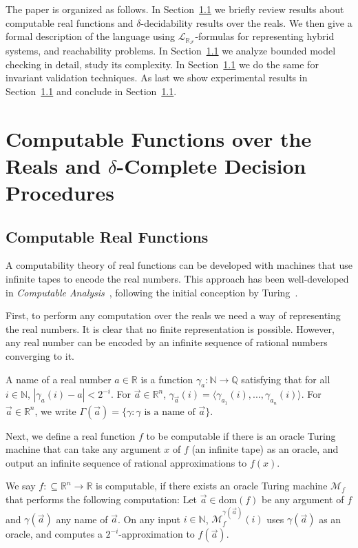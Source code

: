 \documentclass[envcountsect]{llncs}
\newcommand{\dom}{\mathrm{dom}}
\newcommand{\lrf}{\mathcal{L}_{\mathbb{R}_{\mathcal{F}}}}
\begin{document}
The paper is organized as follows. In Section~\ref{} we briefly review results 
about computable real functions and $\delta$-decidability results over the
reals. We then give a formal description of the language using $\lrf$-formulas
for representing hybrid systems, and reachability problems. In Section~\ref{} we
analyze bounded model checking in detail, study its complexity. In
Section~\ref{} we do the same for invariant validation techniques. As last we
show experimental results in Section~\ref{} and conclude in Section~\ref{}.

 

\section{Computable Functions over the Reals and $\delta$-Complete Decision Procedures}

\subsection{Computable Real Functions}

A computability theory of real functions can be developed with machines that 
use infinite tapes to encode the real numbers. This approach has been
well-developed in {\em Computable Analysis}~\cite{CAbook,Kobook,vasco},
following the initial conception by Turing~\cite{}.

First, to perform any computation over the reals we need a way of representing 
the real numbers. It is clear that no finite representation is possible.
However, any real number can be encoded by an infinite sequence of rational
numbers converging to it. 
\begin{definition}[Names]
A name of a real number $a\in \mathbb{R}$ is a function
$\mathcal{\gamma}_a: \mathbb{N}\rightarrow \mathbb{Q}$ satisfying that for all
$i\in \mathbb{N}$, $|\gamma_a(i) - a|<2^{-i}.$ For $\vec a\in \mathbb{R}^n$,
$\gamma_{\vec a}(i) = \langle \gamma_{a_1}(i), ..., \gamma_{a_n}(i)\rangle$. For
$\vec a\in \mathbb{R}^n$, we write $\Gamma(\vec a) = \{\gamma: \gamma\mbox{ is a
name of }\vec a\}$. 
\end{definition}

Next, we define a real function $f$ to be computable if there is an oracle 
Turing machine that can take any argument $x$ of $f$ (an infinite tape) as an
oracle, and output an infinite sequence of rational approximations to $f(x)$. 

\begin{definition} We say
$f:\subseteq\mathbb{R}^n\rightarrow \mathbb{R}$ is computable, if there exists
an oracle Turing machine $\mathcal{M}_f$ that performs the following
computation: Let $\vec a\in \dom(f)$ be any argument of $f$ and $\gamma(\vec a)$
any name of $\vec a$. On any input $i\in \mathbb{N}$,
$\mathcal{M}_f^{\gamma(\vec a)}(i)$ uses $\gamma(\vec a)$ as an oracle, and
computes a $2^{-i}$-approximation to $f(\vec a)$. 
\end{definition}
\end{document}
